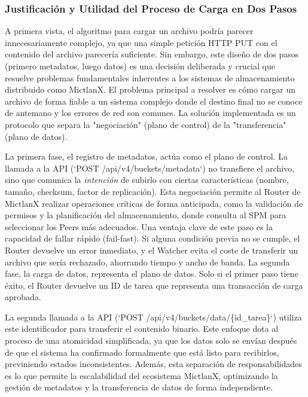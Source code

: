 \subsubsection{Justificación y Utilidad del Proceso de Carga en Dos Pasos}
A primera vista, el algoritmo para cargar un archivo podría parecer innecesariamente complejo, ya que una simple petición HTTP PUT con el contenido del archivo parecería suficiente. Sin embargo, este diseño de dos pasos (primero metadatos, luego datos) es una decisión deliberada y crucial que resuelve problemas fundamentales inherentes a los sistemas de almacenamiento distribuido como MictlanX. El problema principal a resolver es cómo cargar un archivo de forma fiable a un sistema complejo donde el destino final no se conoce de antemano y los errores de red son comunes. La solución implementada es un protocolo que separa la "negociación" (plano de control) de la "transferencia" (plano de datos). 

La primera fase, el registro de metadatos, actúa como el plano de control. La llamada a la API (`POST /api/v4/buckets/metadata`) no transfiere el archivo, sino que comunica la \textit{intención} de subirlo con ciertas características (nombre, tamaño, checksum, factor de replicación). Esta negociación permite al Router de MictlanX realizar operaciones críticas de forma anticipada, como la validación de permisos y la planificación del almacenamiento, donde consulta al SPM para seleccionar los Peers más adecuados. Una ventaja clave de este paso es la capacidad de fallar rápido (fail-fast). 
Si alguna condición previa no se cumple, el Router devuelve un error inmediato, y el Watcher evita el coste de transferir un archivo que sería rechazado, ahorrando tiempo y ancho de banda. La segunda fase, la carga de datos, representa el plano de datos. Solo si el primer paso tiene éxito, el Router devuelve un ID de tarea que representa una transacción de carga aprobada.

 La segunda llamada a la API (`POST /api/v4/buckets/data/\{id\_tarea\}`) utiliza este identificador para transferir el contenido binario. Este enfoque dota al proceso de una atomicidad simplificada, ya que los datos solo se envían después de que el sistema ha confirmado formalmente que está listo para recibirlos, previniendo estados inconsistentes. Además, esta separación de responsabilidades es lo que permite la escalabilidad del ecosistema MictlanX, optimizando la gestión de metadatos y la transferencia de datos de forma independiente.

